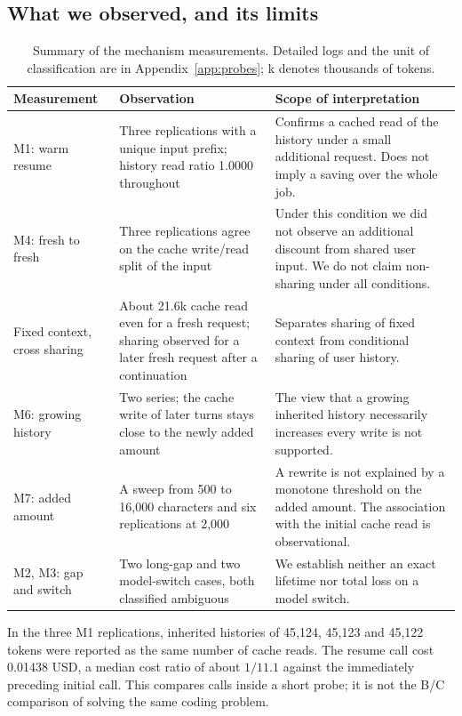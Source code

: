 \documentclass[a4paper,11pt]{article}
\begin{document}
\subsection{What we observed, and its limits}
\begin{table}[!htbp]
\centering\small
\begin{tabularx}{\linewidth}{>{\raggedright\arraybackslash}p{26mm}>{\raggedright\arraybackslash}p{30mm}Y}
\toprule
Measurement & Observation & Scope of interpretation\\
\midrule
M1: warm resume & Three replications with a unique input prefix; history read ratio 1.0000 throughout & Confirms a cached read of the history under a small additional request. Does not imply a saving over the whole job.\\
M4: fresh to fresh & Three replications agree on the cache write/read split of the input & Under this condition we did not observe an additional discount from shared user input. We do not claim non-sharing under all conditions.\\
Fixed context, cross sharing & About 21.6k cache read even for a fresh request; sharing observed for a later fresh request after a continuation & Separates sharing of fixed context from conditional sharing of user history.\\
M6: growing history & Two series; the cache write of later turns stays close to the newly added amount & The view that a growing inherited history necessarily increases every write is not supported.\\
M7: added amount & A sweep from 500 to 16{,}000 characters and six replications at 2{,}000 & A rewrite is not explained by a monotone threshold on the added amount. The association with the initial cache read is observational.\\
M2, M3: gap and switch & Two long-gap and two model-switch cases, both classified ambiguous & We establish neither an exact lifetime nor total loss on a model switch.\\
\bottomrule
\end{tabularx}
\caption{Summary of the mechanism measurements. Detailed logs and the unit of classification are in Appendix~\ref{app:probes}; k denotes thousands of tokens.}
\label{tab:probes}
\end{table}

In the three M1 replications, inherited histories of 45{,}124, 45{,}123 and 45{,}122 tokens were reported as the same number of cache reads. The resume call cost 0.01438 USD, a median cost ratio of about $1/11.1$ against the immediately preceding initial call. This compares calls inside a short probe; it is not the B/C comparison of solving the same coding problem.
\end{document}
